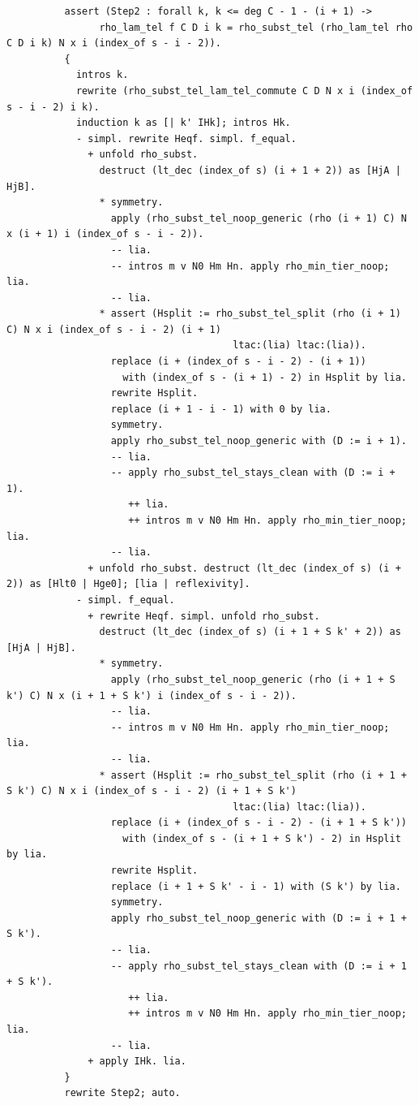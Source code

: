\begin{latin}
\begin{verbatim}
          assert (Step2 : forall k, k <= deg C - 1 - (i + 1) ->
                rho_lam_tel f C D i k = rho_subst_tel (rho_lam_tel rho C D i k) N x i (index_of s - i - 2)).
          {
            intros k.
            rewrite (rho_subst_tel_lam_tel_commute C D N x i (index_of s - i - 2) i k).
            induction k as [| k' IHk]; intros Hk.
            - simpl. rewrite Heqf. simpl. f_equal.
              + unfold rho_subst.
                destruct (lt_dec (index_of s) (i + 1 + 2)) as [HjA | HjB].
                * symmetry.
                  apply (rho_subst_tel_noop_generic (rho (i + 1) C) N x (i + 1) i (index_of s - i - 2)).
                  -- lia.
                  -- intros m v N0 Hm Hn. apply rho_min_tier_noop; lia.
                  -- lia.
                * assert (Hsplit := rho_subst_tel_split (rho (i + 1) C) N x i (index_of s - i - 2) (i + 1)
                                       ltac:(lia) ltac:(lia)).
                  replace (i + (index_of s - i - 2) - (i + 1))
                    with (index_of s - (i + 1) - 2) in Hsplit by lia.
                  rewrite Hsplit.
                  replace (i + 1 - i - 1) with 0 by lia.
                  symmetry.
                  apply rho_subst_tel_noop_generic with (D := i + 1).
                  -- lia.
                  -- apply rho_subst_tel_stays_clean with (D := i + 1).
                     ++ lia.
                     ++ intros m v N0 Hm Hn. apply rho_min_tier_noop; lia.
                  -- lia.
              + unfold rho_subst. destruct (lt_dec (index_of s) (i + 2)) as [Hlt0 | Hge0]; [lia | reflexivity].
            - simpl. f_equal.
              + rewrite Heqf. simpl. unfold rho_subst.
                destruct (lt_dec (index_of s) (i + 1 + S k' + 2)) as [HjA | HjB].
                * symmetry.
                  apply (rho_subst_tel_noop_generic (rho (i + 1 + S k') C) N x (i + 1 + S k') i (index_of s - i - 2)).
                  -- lia.
                  -- intros m v N0 Hm Hn. apply rho_min_tier_noop; lia.
                  -- lia.
                * assert (Hsplit := rho_subst_tel_split (rho (i + 1 + S k') C) N x i (index_of s - i - 2) (i + 1 + S k')
                                       ltac:(lia) ltac:(lia)).
                  replace (i + (index_of s - i - 2) - (i + 1 + S k'))
                    with (index_of s - (i + 1 + S k') - 2) in Hsplit by lia.
                  rewrite Hsplit.
                  replace (i + 1 + S k' - i - 1) with (S k') by lia.
                  symmetry.
                  apply rho_subst_tel_noop_generic with (D := i + 1 + S k').
                  -- lia.
                  -- apply rho_subst_tel_stays_clean with (D := i + 1 + S k').
                     ++ lia.
                     ++ intros m v N0 Hm Hn. apply rho_min_tier_noop; lia.
                  -- lia.
              + apply IHk. lia.
          }
          rewrite Step2; auto.


\end{verbatim}
\end{latin}
